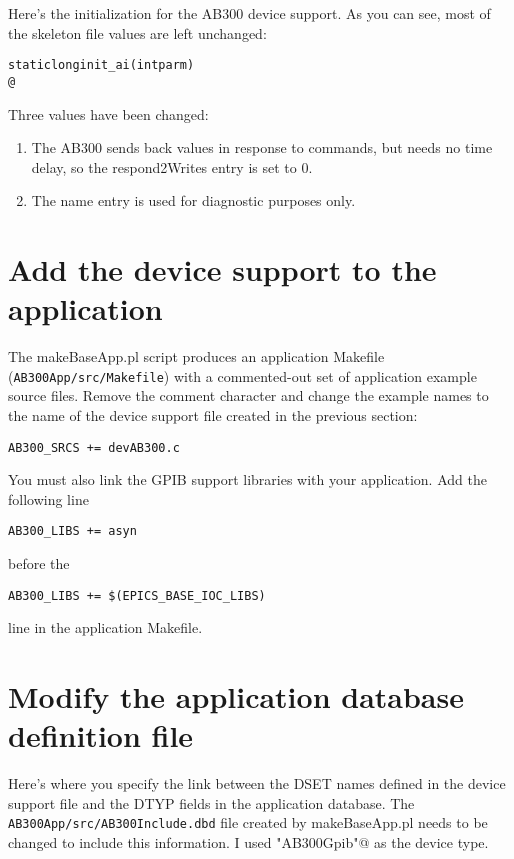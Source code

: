 \documentclass[twoside]{article}
\begin{document}
Here's the initialization for the AB300 device support.  As you can see, most of
the skeleton file values are left unchanged:
\begin{alltt}
static long init_ai(int parm)
@
\end{alltt}
Three values have been changed:
\begin{enumerate}
\item
The AB300 sends back values in response to commands, but needs no time delay,
so the respond2Writes entry is set to 0.
\item
The name entry is used for diagnostic purposes only.
\end{enumerate}

\section{Add the device support to the application}
The makeBaseApp.pl script produces an application Makefile
({\tt AB300App/src/Makefile})
with a commented-out set of application example source files.
Remove the comment character and change the example names to the
name of the device support file created in the previous section:
\begin{verbatim}
AB300_SRCS += devAB300.c
\end{verbatim}

You must also link the GPIB support libraries with your application.  Add the following line
\begin{verbatim}
AB300_LIBS += asyn
\end{verbatim}
before the
\begin{verbatim}
AB300_LIBS += $(EPICS_BASE_IOC_LIBS)
\end{verbatim}
line in the application Makefile.





\section{Modify the application database definition file}
Here's where you specify the link between the DSET names defined in the
device support file and the DTYP fields in the application database.
The {\tt AB300App/src/AB300Include.dbd} file created by makeBaseApp.pl needs to
be changed to include this information.
I used \verb@"AB300Gpib"@ as the device type.
\end{document}

